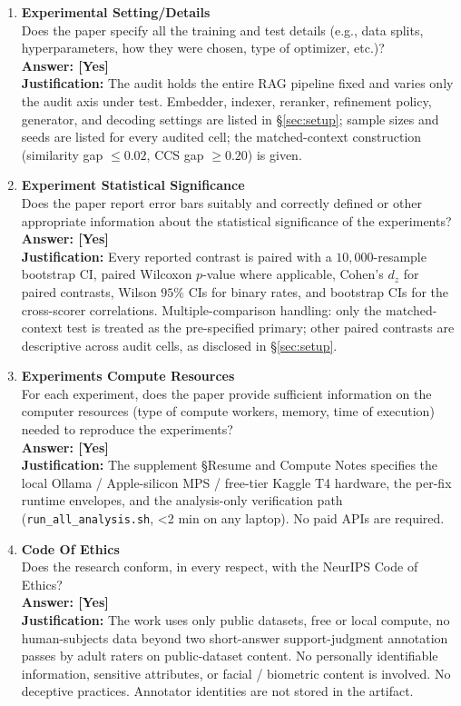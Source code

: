 \begin{enumerate}
\item {\bf Experimental Setting/Details}\\
Does the paper specify all the training and test details (e.g., data
splits, hyperparameters, how they were chosen, type of optimizer,
etc.)?
\\\textbf{Answer: [Yes]}
\\\textbf{Justification:} The audit holds the entire RAG pipeline
fixed and varies only the audit axis under test. Embedder, indexer,
reranker, refinement policy, generator, and decoding settings are
listed in \S\ref{sec:setup}; sample sizes and seeds are listed for
every audited cell; the matched-context construction (similarity gap
$\leq 0.02$, CCS gap $\geq 0.20$) is given.

\item {\bf Experiment Statistical Significance}\\
Does the paper report error bars suitably and correctly defined or
other appropriate information about the statistical significance of
the experiments?
\\\textbf{Answer: [Yes]}
\\\textbf{Justification:} Every reported contrast is paired with a
$10{,}000$-resample bootstrap CI, paired Wilcoxon $p$-value where
applicable, Cohen's $d_z$ for paired contrasts, Wilson $95\%$ CIs for
binary rates, and bootstrap CIs for the cross-scorer correlations.
Multiple-comparison handling: only the matched-context test is
treated as the pre-specified primary; other paired contrasts are
descriptive across audit cells, as disclosed in \S\ref{sec:setup}.

\item {\bf Experiments Compute Resources}\\
For each experiment, does the paper provide sufficient information on
the computer resources (type of compute workers, memory, time of
execution) needed to reproduce the experiments?
\\\textbf{Answer: [Yes]}
\\\textbf{Justification:} The supplement \S Resume and Compute Notes
specifies the local Ollama / Apple-silicon MPS / free-tier Kaggle T4
hardware, the per-fix runtime envelopes, and the analysis-only
verification path (\texttt{run\_all\_analysis.sh}, \textless 2 min on
any laptop). No paid APIs are required.

\item {\bf Code Of Ethics}\\
Does the research conform, in every respect, with the NeurIPS Code of
Ethics?
\\\textbf{Answer: [Yes]}
\\\textbf{Justification:} The work uses only public datasets, free or
local compute, no human-subjects data beyond two short-answer
support-judgment annotation passes by adult raters on public-dataset
content. No personally identifiable information, sensitive attributes,
or facial / biometric content is involved. No deceptive practices.
Annotator identities are not stored in the artifact.


\end{enumerate}
